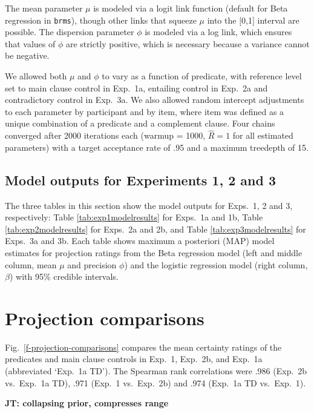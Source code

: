 \documentclass[11pt,fleqn]{article}
\newcommand{\jt}[1]{\textbf{\color{blue}JT: #1}}
\newcommand{\figref}[1]{Fig.~\ref{#1}}
\newcommand{\6}{\mbox{$[\hspace*{-.6mm}[$}}
\newcommand{\9}{\mbox{$]\hspace*{-.6mm}]$}}
\begin{document}
The mean parameter $\mu$ is modeled via a logit link function (default for Beta regression in \verb|brms|), though other links that squeeze $\mu$ into the $[$0,1$]$ interval are possible. The dispersion parameter $\phi$ is modeled via a log link, which ensures that values of $\phi$ are strictly positive, which is necessary because a variance cannot be negative. 

We allowed both $\mu$ and $\phi$ to vary as a function of predicate, with reference level set to main clause control in Exp.~1a, entailing control in Exp.~2a and contradictory control in Exp.~3a. We also allowed random intercept adjustments to each parameter by participant and by item, where item was defined as a unique combination of a predicate and a complement clause. Four chains converged after 2000 iterations each (warmup = 1000, \(\hat{R}=1\) for all estimated parameters) with a target acceptance rate of .95 and a maximum treedepth of 15.

\subsection{Model outputs for Experiments 1, 2 and 3}\label{a-mo}

The three tables in this section show the model outputs for Exps.~1, 2 and 3, respectively: Table \ref{tab:exp1modelresults} for Exps.~1a and 1b, Table \ref{tab:exp2modelresults} for Exps.~2a and 2b, and Table \ref{tab:exp3modelresults} for Exps.~3a and 3b. Each table shows maximum a posteriori (MAP) model estimates for projection ratings from the Beta regression model (left and middle column, mean $\mu$ and precision $\phi$) and the logistic regression model (right column, $\beta$)  with 95\% credible intervals.

\section{Projection comparisons}\label{a-comparison}

\figref{f-projection-comparisons} compares the mean certainty ratings of the predicates and main clause controls in Exp.~1, Exp.~2b, and  Exp.~1a (abbreviated `Exp.~1a TD'). The Spearman rank correlations were .986 (Exp.~2b vs.\ Exp.~1a TD), .971 (Exp.~1 vs.\ Exp.~2b) and .974 (Exp.~1a TD vs.\  Exp.~1).

\jt{collapsing prior, compresses range}
\end{document}
